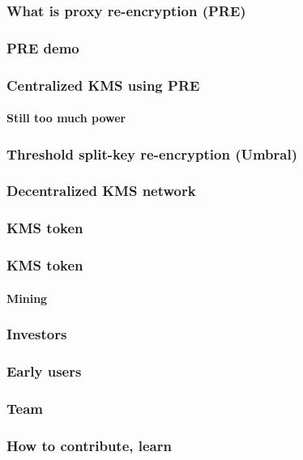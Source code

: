\documentclass[xetex,mathsans,sans]{beamer}
\begin{document}
    \begin{frame}
        \frametitle{What is proxy re-encryption (PRE)}
    \end{frame}

    \begin{frame}
        \frametitle{PRE demo}
    \end{frame}

    \begin{frame}
        \frametitle{Centralized KMS using PRE}
        \framesubtitle{Still too much power}
    \end{frame}

    \begin{frame}
        \frametitle{Threshold split-key re-encryption (Umbral)}
    \end{frame}

    \begin{frame}
        \frametitle{Decentralized KMS network}
    \end{frame}

    \begin{frame}
        \frametitle{KMS token}
    \end{frame}

    \begin{frame}
        \frametitle{KMS token}
        \framesubtitle{Mining}
    \end{frame}

    \begin{frame}
        \frametitle{Investors}
    \end{frame}

    \begin{frame}
        \frametitle{Early users}
    \end{frame}

    \begin{frame}
        \frametitle{Team}
    \end{frame}

    \begin{frame}
        \frametitle{How to contribute, learn}
    \end{frame}
\end{document}

